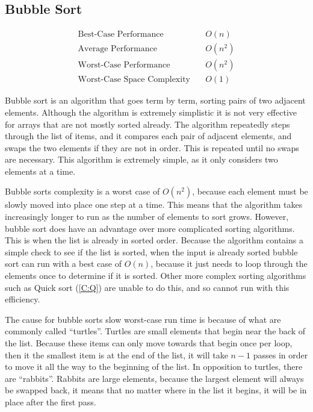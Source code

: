 \documentclass{subfile}
\begin{document}
\subsection{Bubble Sort}\label{C:B}
\begin{align*}
  \text{Best-Case Performance}\quad &O\left(n\right)\\
  \text{Average Performance}\quad &O\left(n^{2}\right)\\
  \text{Worst-Case Performance}\quad &O\left(n^{2}\right)\\
  \text{Worst-Case Space Complexity}\quad &O\left(1\right)
\end{align*}
\begin{multicols}{2}
  Bubble sort is an algorithm that goes term by term, sorting pairs of two adjacent elements. Although the algorithm is extremely simplistic it is not very effective for arrays that are not mostly sorted already. The algorithm repeatedly steps through the list of items, and it compares each pair of adjacent elements, and swaps the two elements if they are not in order. This is repeated until no swaps are necessary. This algorithm is extremely simple, as it only considers two elements at a time.
  \par
  Bubble sorts complexity is a worst case of $O\left(n^{2}\right)$, because each element must be slowly moved into place one step at a time. This means that the algorithm takes increasingly longer to run as the number of elements to sort grows. However, bubble sort does have an advantage over more complicated sorting algorithms. This is when the list is already in sorted order. Because the algorithm contains a simple check to see if the list is sorted, when the input is already sorted bubble sort can run with a best case of $O\left( n\right)$, because it just needs to loop through the elements once to determine if it is sorted. Other more complex sorting algorithms such as Quick sort (\ref{C:Q}) are unable to do this, and so cannot run with this efficiency.
  \par
  The cause for bubble sorts slow worst-case run time is because of what are commonly called ``turtles''. Turtles are small elements that begin near the back of the list. Because these items can only move towards that begin once per loop, then it the smallest item is at the end of the list, it will take $n-1$ passes in order to move it all the way to the beginning of the list. In opposition to turtles, there are ``rabbits''. Rabbits are large elements, because the largest element will always be swapped back, it means that no matter where in the list it begins, it will be in place after the first pass.

\end{multicols}
\end{document}

